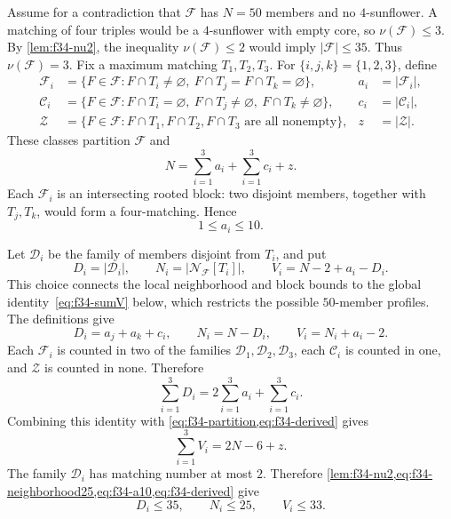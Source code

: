 \documentclass[11pt]{article}
\numberwithin{equation}{section}
\theoremstyle{definition}
\theoremstyle{remark}
\newcommand{\F}{\mathcal F}
\newcommand{\C}{\mathcal C}
\newcommand{\D}{\mathcal D}
\begin{document}
Assume for a contradiction that $\F$ has $N=50$ members and no
$4$-sunflower. A matching of four triples would be a $4$-sunflower with
empty core, so $\nu(\F)\le3$. By \cref{lem:f34-nu2}, the inequality
$\nu(\F)\le2$ would imply $|\F|\le35$. Thus $\nu(\F)=3$. Fix a maximum
matching $T_1,T_2,T_3$. For $\{i,j,k\}=\{1,2,3\}$, define
\begin{align*}
 \F_i&=\{F\in\F:F\cap T_i\ne\varnothing,
              \ F\cap T_j=F\cap T_k=\varnothing\},&a_i&=|\F_i|,\\
 \C_i&=\{F\in\F:F\cap T_i=\varnothing,
              \ F\cap T_j\ne\varnothing,
              \ F\cap T_k\ne\varnothing\},&c_i&=|\C_i|,\\
 \mathcal Z&=\{F\in\F:F\cap T_1,F\cap T_2,F\cap T_3
              \text{ are all nonempty}\},&z&=|\mathcal Z|.
\end{align*}
These classes partition $\F$ and
\begin{equation}
 N=\sum_{i=1}^3a_i+\sum_{i=1}^3c_i+z.
 \label{eq:f34-partition}
\end{equation}
Each $\F_i$ is an intersecting rooted block: two disjoint members, together
with $T_j,T_k$, would form a four-matching. Hence
\begin{equation}
 1\le a_i\le10.
 \label{eq:f34-a10}
\end{equation}

Let $\D_i$ be the family of members disjoint from $T_i$, and put
\[
 D_i=|\D_i|,
 \qquad
 N_i=|\mathcal N_{\F}[T_i]|,
 \qquad
 V_i=N-2+a_i-D_i.
\]
This choice connects the local neighborhood and block bounds to
the global identity~\eqref{eq:f34-sumV} below, which restricts the possible
$50$-member profiles. The definitions give
\begin{equation}
 D_i=a_j+a_k+c_i,
 \qquad
 N_i=N-D_i,
 \qquad
 V_i=N_i+a_i-2.
 \label{eq:f34-derived}
\end{equation}
Each $\F_i$ is counted in two of the families $\D_1,\D_2,\D_3$, each
$\C_i$ is counted in one, and $\mathcal Z$ is counted in none. Therefore
\[
 \sum_{i=1}^3D_i=2\sum_{i=1}^3a_i+\sum_{i=1}^3c_i.
\]
Combining this identity with \cref{eq:f34-partition,eq:f34-derived} gives
\begin{equation}
 \sum_{i=1}^3V_i=2N-6+z.
 \label{eq:f34-sumV}
\end{equation}
The family $\D_i$ has matching number at most $2$. Therefore
\cref{lem:f34-nu2,eq:f34-neighborhood25,eq:f34-a10,eq:f34-derived} give
\begin{equation}
 D_i\le35,
 \qquad
 N_i\le25,
 \qquad
 V_i\le33.
 \label{eq:f34-basic-profile}
\end{equation}
\end{document}
